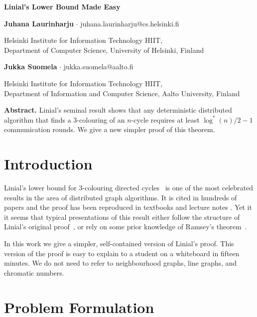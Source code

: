 \documentclass[11pt,a4paper]{article}
\begin{document}
\begin{flushleft}
{\Large\bfseries Linial's Lower Bound Made Easy\par}

\bigskip
\textbf{Juhana Laurinharju}
$\cdot$
{\sffamily\small juhana.laurinharju@cs.helsinki.fi}

{\footnotesize
Helsinki Institute for Information Technology HIIT, \\
Department of Computer Science, University of Helsinki, Finland\par}

\medskip
\textbf{Jukka Suomela}
$\cdot$
{\sffamily\small jukka.suomela@aalto.fi}

{\footnotesize
Helsinki Institute for Information Technology HIIT, \\
Department of Information and Computer Science, Aalto University, Finland\par}
\end{flushleft}

\bigskip
\bigskip
\noindent\textbf{Abstract.}
Linial's seminal result shows that any deterministic distributed algorithm that finds a $3$-colouring of an $n$-cycle requires at least $\log^*(n)/2 - 1$ communication rounds. We give a new simpler proof of this theorem.

\medskip


\section{Introduction}

Linial's lower bound for $3$-colouring directed cycles~\cite{linial92locality} is one of the most celebrated results in the area of distributed graph algorithms. It is cited in hundreds of papers and the proof has been reproduced in textbooks and lecture notes \cite{peleg00distributed,barenboim13distributed,wattenhofer13lecture,suomela-ddabook}. Yet it it seems that typical presentations of this result either follow the structure of Linial's original proof~\cite{peleg00distributed,barenboim13distributed,wattenhofer13lecture}, or rely on some prior knowledge of Ramsey's theorem~\cite{suomela-ddabook}.

In this work we give a simpler, self-contained version of Linial's proof. This version of the proof is easy to explain to a student on a whiteboard in fifteen minutes. We do not need to refer to neighbourhood graphs, line graphs, and chromatic numbers.


\section{Problem Formulation}
\end{document}
